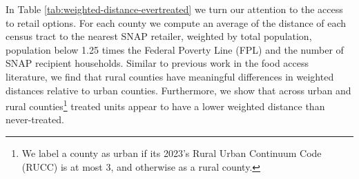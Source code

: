 \documentclass[12pt]{article}
\begin{document}



In Table \ref{tab:weighted-distance-evertreated} we  turn our attention to the access to retail options. For each  county we compute an average of the distance of each census tract to the nearest SNAP retailer, weighted by total population, population below 1.25 times the Federal Poverty Line (FPL) and the number of SNAP recipient households. Similar to previous work in the food access literature, we find that rural counties have meaningful differences in weighted distances relative to urban counties. Furthermore, we show that across urban and rural counties\footnote{We label a county as urban if its 2023's Rural Urban Continuum Code (RUCC) is at most 3, and otherwise as a rural county.} treated units appear to have a lower weighted distance than never-treated. 
\end{document}
